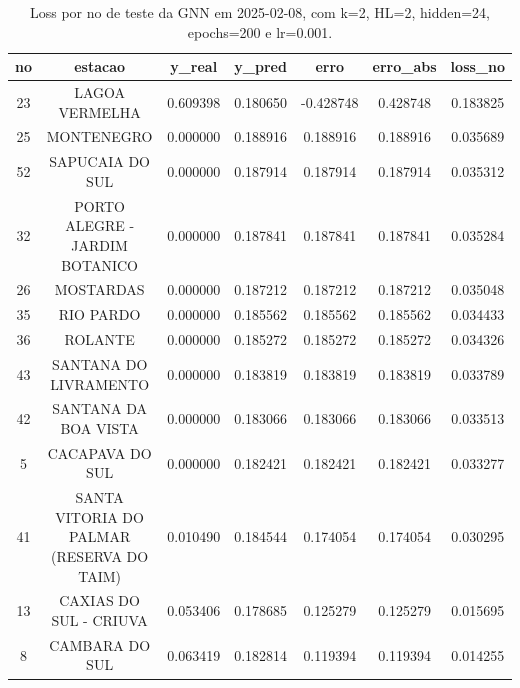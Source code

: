 \begin{table}[h]
\centering
\caption{Loss por no de teste da GNN em 2025-02-08, com k=2, HL=2, hidden=24, epochs=200 e lr=0.001.}
\label{tab:gnn_loss_k2_hl2_h24_e200_d20250208}
\begin{tabular}{ccccccc}
\toprule
no & estacao & y\_real & y\_pred & erro & erro\_abs & loss\_no \\
\midrule
23 & LAGOA VERMELHA & 0.609398 & 0.180650 & -0.428748 & 0.428748 & 0.183825 \\
25 & MONTENEGRO & 0.000000 & 0.188916 & 0.188916 & 0.188916 & 0.035689 \\
52 & SAPUCAIA DO SUL & 0.000000 & 0.187914 & 0.187914 & 0.187914 & 0.035312 \\
32 & PORTO ALEGRE - JARDIM BOTANICO & 0.000000 & 0.187841 & 0.187841 & 0.187841 & 0.035284 \\
26 & MOSTARDAS & 0.000000 & 0.187212 & 0.187212 & 0.187212 & 0.035048 \\
35 & RIO PARDO & 0.000000 & 0.185562 & 0.185562 & 0.185562 & 0.034433 \\
36 & ROLANTE & 0.000000 & 0.185272 & 0.185272 & 0.185272 & 0.034326 \\
43 & SANTANA DO LIVRAMENTO & 0.000000 & 0.183819 & 0.183819 & 0.183819 & 0.033789 \\
42 & SANTANA DA BOA VISTA & 0.000000 & 0.183066 & 0.183066 & 0.183066 & 0.033513 \\
5 & CACAPAVA DO SUL & 0.000000 & 0.182421 & 0.182421 & 0.182421 & 0.033277 \\
41 & SANTA VITORIA DO PALMAR (RESERVA DO TAIM) & 0.010490 & 0.184544 & 0.174054 & 0.174054 & 0.030295 \\
13 & CAXIAS DO SUL - CRIUVA & 0.053406 & 0.178685 & 0.125279 & 0.125279 & 0.015695 \\
8 & CAMBARA DO SUL & 0.063419 & 0.182814 & 0.119394 & 0.119394 & 0.014255 \\
\bottomrule
\end{tabular}
\end{table}
